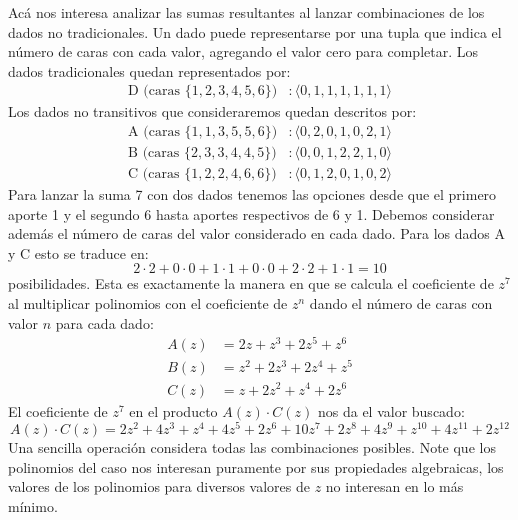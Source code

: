   Acá nos interesa analizar las sumas resultantes
  al lanzar combinaciones de los dados no tradicionales.
  Un dado puede representarse por una tupla
  que indica el número de caras con cada valor,
  agregando el valor cero para completar.
  Los dados tradicionales quedan representados por:
  \begin{align*}
    \mathrm{D}
      \text{\ (caras \(\{1, 2, 3, 4, 5, 6\}\))}
      &\colon \langle 0, 1, 1, 1, 1, 1, 1 \rangle
  \end{align*}
  Los dados no transitivos que consideraremos quedan descritos por:
  \begin{align*}
    \mathrm{A}
      \text{\ (caras \(\{1, 1, 3, 5, 5, 6\}\))}
      &\colon \langle 0, 2, 0, 1, 0, 2, 1 \rangle \\
    \mathrm{B}
      \text{\ (caras \(\{2, 3, 3, 4, 4, 5\}\))}
      &\colon \langle 0, 0, 1, 2, 2, 1, 0 \rangle \\
    \mathrm{C}
      \text{\ (caras \(\{1, 2, 2, 4, 6, 6\}\))}
      &\colon \langle 0, 1, 2, 0, 1, 0, 2 \rangle
  \end{align*}
  Para lanzar
  la suma \num{7} con dos dados
  tenemos las opciones
  desde que el primero aporte \num{1} y el segundo \num{6}
  hasta aportes respectivos de \num{6} y \num{1}.
  Debemos considerar además el número de caras del valor considerado
  en cada dado.
  Para los dados \(\mathrm{A}\) y \(\mathrm{C}\)
  esto se traduce en:
  \begin{equation*}
    2\cdot 2 + 0 \cdot 0 + 1 \cdot 1 + 0 \cdot 0 + 2 \cdot 2 + 1 \cdot 1
      = 10
  \end{equation*}
  posibilidades.
  Esta es exactamente la manera en que se calcula
  el coeficiente de \(z^7\) al multiplicar polinomios
  con el coeficiente de \(z^n\)
  dando el número de caras con valor \(n\) para cada dado:
  \begin{align*}
    A(z)
      &= 2 z		   +   z^3	   + 2 z^5 +   z^6 \\
    B(z)
      &=	 z^2	   + 2 z^3 + 2 z^4 +   z^5 \\
    C(z)
      &=   z + 2 z^2	   + z^4		   + 2 z^6
  \end{align*}
  El coeficiente de \(z^7\)
  en el producto \(A(z) \cdot C(z)\) nos da el valor buscado:
  \begin{equation*}
    A(z) \cdot C(z)
      = 2 z^2 + 4 z^3 +	  z^4 + 4 z^5	 + 2 z^6    + 10 z^7
              + 2 z^8 + 4 z^9 +	  z^{10} + 4 z^{11} + 2 z^{12}
  \end{equation*}
  Una sencilla operación
  considera todas las combinaciones posibles.
  Note que los polinomios del caso nos interesan
  puramente por sus propiedades algebraicas,
  los valores de los polinomios para diversos valores de \(z\)
  no interesan en lo más mínimo.

